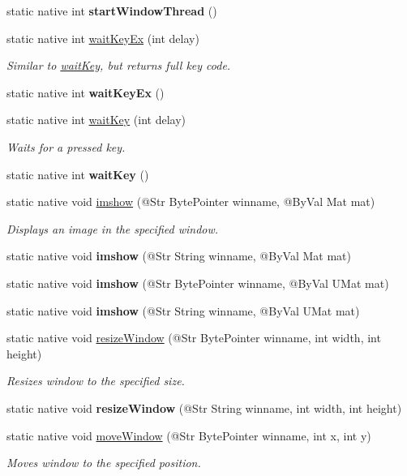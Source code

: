 \begin{DoxyCompactItemize}
static native int {\bfseries start\+Window\+Thread} ()
\item 
static native int \hyperlink{group__highgui_ga6a23d9d2816fcc0c96c3445b5969f5ac}{wait\+Key\+Ex} (int delay)
\begin{DoxyCompactList}\small\item\em Similar to \hyperlink{group__highgui_gaf924607bac022bb3603e459e3f2f3239}{wait\+Key}, but returns full key code. \end{DoxyCompactList}\item 
static native int {\bfseries wait\+Key\+Ex} ()
\item 
static native int \hyperlink{group__highgui_gaf924607bac022bb3603e459e3f2f3239}{wait\+Key} (int delay)
\begin{DoxyCompactList}\small\item\em Waits for a pressed key. \end{DoxyCompactList}\item 
static native int {\bfseries wait\+Key} ()
\item 
static native void \hyperlink{group__highgui_gaf05d46739d8a87edb7405e79c7207975}{imshow} (@Str Byte\+Pointer winname, @By\+Val Mat mat)
\begin{DoxyCompactList}\small\item\em Displays an image in the specified window. \end{DoxyCompactList}\item 
static native void {\bfseries imshow} (@Str String winname, @By\+Val Mat mat)
\item 
static native void {\bfseries imshow} (@Str Byte\+Pointer winname, @By\+Val U\+Mat mat)
\item 
static native void {\bfseries imshow} (@Str String winname, @By\+Val U\+Mat mat)
\item 
static native void \hyperlink{group__highgui_ga4e805fd30f0df6fd2b5715cf89f4f80e}{resize\+Window} (@Str Byte\+Pointer winname, int width, int height)
\begin{DoxyCompactList}\small\item\em Resizes window to the specified size. \end{DoxyCompactList}\item 
static native void {\bfseries resize\+Window} (@Str String winname, int width, int height)
\item 
static native void \hyperlink{group__highgui_ga7731f7680d8bb28a3e069616f3395907}{move\+Window} (@Str Byte\+Pointer winname, int x, int y)
\begin{DoxyCompactList}\small\item\em Moves window to the specified position. \end{DoxyCompactList}\item 

\end{DoxyCompactItemize}
